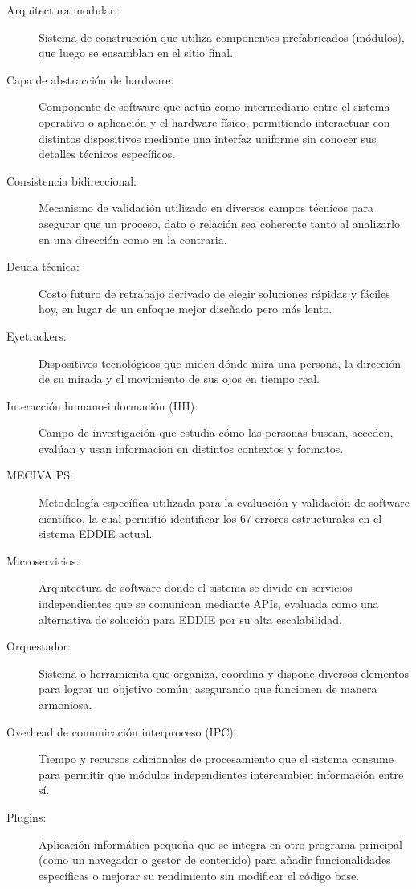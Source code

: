 \begin{glosario}
\begin{description}
  \item[Arquitectura modular:] Sistema de construcción que utiliza componentes prefabricados (módulos), que luego se ensamblan en el sitio final.
  \item[Capa de abstracción de hardware:] Componente de software que actúa como intermediario entre el sistema operativo o aplicación y el hardware físico, permitiendo interactuar con distintos dispositivos mediante una interfaz uniforme sin conocer sus detalles técnicos específicos.
  \item[Consistencia bidireccional:] Mecanismo de validación utilizado en diversos campos técnicos para asegurar que un proceso, dato o relación sea coherente tanto al analizarlo en una dirección como en la contraria.
  \item[Deuda técnica:] Costo futuro de retrabajo derivado de elegir soluciones rápidas y fáciles hoy, en lugar de un enfoque mejor diseñado pero más lento.
  \item[Eyetrackers:] Dispositivos tecnológicos que miden dónde mira una persona, la dirección de su mirada y el movimiento de sus ojos en tiempo real.
  \item[Interacción humano-información (HII):] Campo de investigación que estudia cómo las personas buscan, acceden, evalúan y usan información en distintos contextos y formatos.
  \item[MECIVA PS:] Metodología específica utilizada para la evaluación y validación de software científico, la cual permitió identificar los 67 errores estructurales en el sistema EDDIE actual.
  \item[Microservicios:] Arquitectura de software donde el sistema se divide en servicios independientes que se comunican mediante APIs, evaluada como una alternativa de solución para EDDIE por su alta escalabilidad.
  \item[Orquestador:] Sistema o herramienta que organiza, coordina y dispone diversos elementos para lograr un objetivo común, asegurando que funcionen de manera armoniosa.
  \item[Overhead de comunicación interproceso (IPC):] Tiempo y recursos adicionales de procesamiento que el sistema consume para permitir que módulos independientes intercambien información entre sí.
  \item[Plugins:] Aplicación informática pequeña que se integra en otro programa principal (como un navegador o gestor de contenido) para añadir funcionalidades específicas o mejorar su rendimiento sin modificar el código base.

\end{description}
\end{glosario}
